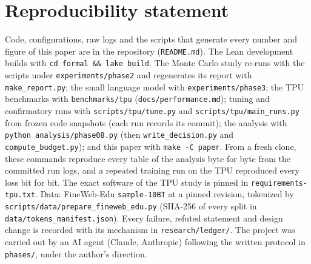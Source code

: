 \section{Reproducibility statement}
\label{sec:repro}

Code, configurations, raw logs and the scripts that generate every number and figure of this paper
are in the repository (\texttt{README.md}). The Lean development builds with
\texttt{cd formal \&\& lake build}. The Monte Carlo study re-runs with the scripts under
\texttt{experiments/phase2} and regenerates its report with \texttt{make\_report.py}; the small
language model with \texttt{experiments/phase3}; the TPU benchmarks with \texttt{benchmarks/tpu}
(\texttt{docs/performance.md}); tuning and confirmatory runs with \texttt{scripts/tpu/tune.py} and
\texttt{scripts/tpu/main\_runs.py} from frozen code snapshots (each run records its commit);
the analysis with \texttt{python analysis/phase08.py} (then \texttt{write\_decision.py} and
\texttt{compute\_budget.py}); and this paper with \texttt{make -C paper}. From a fresh clone,
these commands reproduce every table of the analysis byte for byte from the committed run logs,
and a repeated training run on the TPU reproduced every loss bit for bit. The exact software of
the TPU study is pinned in \texttt{requirements-tpu.txt}.
Data: FineWeb-Edu \texttt{sample-10BT} at a pinned revision, tokenized by
\texttt{scripts/data/prepare\_fineweb\_edu.py} (SHA-256 of every split in
\texttt{data/tokens\_manifest.json}). Every failure, refuted statement and design change is recorded
with its mechanism in \texttt{research/ledger/}. The project was carried out by an AI agent (Claude,
Anthropic) following the written protocol in \texttt{phases/}, under the author's direction.
